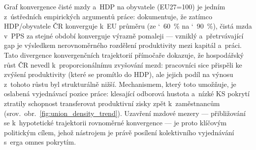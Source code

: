 Graf konvergence čisté mzdy a~\ac{HDP} na obyvatele (EU27=100) je jedním z~ústředních empirických argumentů práce: dokumentuje, že zatímco \ac{HDP}/obyvatele ČR konverguje k~\ac{EU} průměru (ze \char`~60~\% na \char`~90~\%), čistá mzda v~\ac{PPS} za stejné období konverguje výrazně pomaleji --- vzniklý a~přetrvávající gap je výsledkem nerovnoměrného rozdělení produktivity mezi kapitál a~práci.
Tato divergence konvergenčních trajektorií přímočaře dokazuje, že hospodářský růst ČR nevedl k~proporcionálnímu zvyšování mezd: pracovníci sice přispěli ke zvýšení produktivity (které se promítlo do \ac{HDP}), ale jejich podíl na výnosu z~tohoto růstu byl strukturálně nižší.
Mechanismem, který toto umožňuje, je oslabená vyjednávací pozice práce: klesající odborová hustota a~nízké \ac{KS} pokrytí ztratily schopnost transferovat produktivní zisky zpět k~zaměstnancům (srov.~obr.~\ref{fig:union_density_trend}).
Uzavření mzdové mezery --- přibližování se k~hypotetické trajektorii rovnoměrné konvergence --- je proto klíčovým politickým cílem, jehož nástrojem je právě posílení kolektivního vyjednávání s~erga omnes pokrytím.


